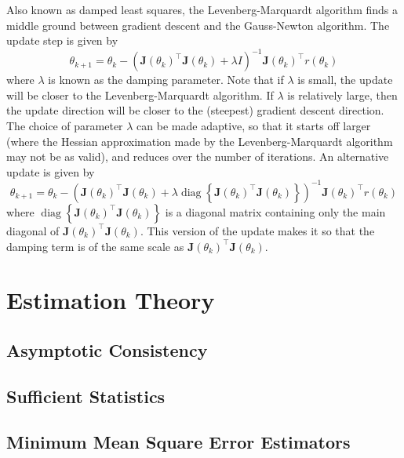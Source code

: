 \documentclass[11pt]{report} %
\begin{document}
Also known as damped least squares, the Levenberg-Marquardt algorithm finds a middle ground between gradient descent and the Gauss-Newton algorithm. The update step is given by
\begin{equation}
\theta_{k + 1} = \theta_{k} - \left(\mathbf{J}\left(\theta_{k}\right)^{\top}\mathbf{J}\left(\theta_{k}\right) + \lambda I\right)^{-1}\mathbf{J}\left(\theta_{k}\right)^{\top}r\left(\theta_{k}\right)
\end{equation}
where $\lambda$ is known as the damping parameter. Note that if $\lambda$ is small, the update will be closer to the Levenberg-Marquardt algorithm. If $\lambda$ is relatively large, then the update direction will be closer to the (steepest) gradient descent direction. The choice of parameter $\lambda$ can be made adaptive, so that it starts off larger (where the Hessian approximation made by the Levenberg-Marquardt algorithm may not be as valid), and reduces over the number of iterations. An alternative update is given by
\begin{equation}
\theta_{k + 1} = \theta_{k} - \left(\mathbf{J}\left(\theta_{k}\right)^{\top}\mathbf{J}\left(\theta_{k}\right) + \lambda \operatorname{diag}\left\{\mathbf{J}\left(\theta_{k}\right)^{\top}\mathbf{J}\left(\theta_{k}\right)\right\}\right)^{-1}\mathbf{J}\left(\theta_{k}\right)^{\top}r\left(\theta_{k}\right)
\end{equation}
where $\operatorname{diag}\left\{\mathbf{J}\left(\theta_{k}\right)^{\top}\mathbf{J}\left(\theta_{k}\right)\right\}$ is a diagonal matrix containing only the main diagonal of $\mathbf{J}\left(\theta_{k}\right)^{\top}\mathbf{J}\left(\theta_{k}\right)$. This version of the update makes it so that the damping term is of the same scale as $\mathbf{J}\left(\theta_{k}\right)^{\top}\mathbf{J}\left(\theta_{k}\right)$.

\section{Estimation Theory}

\subsection{Asymptotic Consistency}

\subsection{Sufficient Statistics}

\subsection{Minimum Mean Square Error Estimators}
\end{document}
